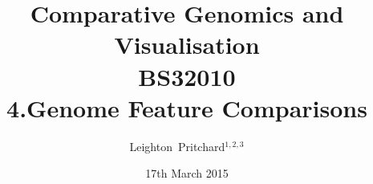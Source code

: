 

%



\title[Comparative Genomics and Visualisation: 4.Genome Features] %
{Comparative Genomics and \\ Visualisation \\
BS32010 \\
4.Genome Feature Comparisons}
\author[Pritchard] %
{Leighton~Pritchard$^{1,2,3}$}
\date[17th March 2015] %
{17th March 2015}
\subject{Bioinformatics, Genomics, Bacteria, Sequencing, Microbiology, Microbes, Comparative Genomics, Visualisation}





\frame[plain]{\titlepage}







